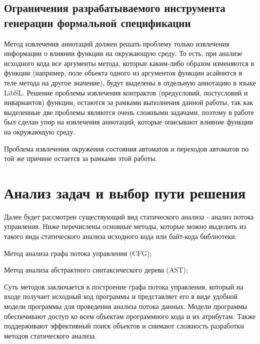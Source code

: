 \subsection{Ограничения разрабатываемого инструмента генерации формальной спецификации}

Метод извлечения аннотаций должен решать проблему только извлечения информации о влиянии функции на окружающую среду.
То есть, при анализе исходного кода все аргументы метода, которые каким-либо образом изменяются в функции (например, поле объекта одного из аргументов функции асайнится в теле метода на другое значение), будут выделены в отдельную аннотацию в языке LibSL.
Решение проблемы извлечения контрактов (предусловий, постусловий и инвариантов) функции,
остаются за рамками выполнения данной работы, так как выделенные две проблемы являются очень сложными задачами,
поэтому в работе был сделан упор на извлечения аннотаций, которые описывают влияние функции на окружающую среду.

Проблема извлечения окружения состояния автоматов и переходов автоматов по той же причине остается за рамками этой работы.

\section{Анализ задач и выбор пути решения}

Далее будет рассмотрен существующий вид статического анализа - анализ потока управления.
Ниже перечислены основные методы, которые можно выделить из такого вида статического анализа исходного кода или байт-кода библиотеки:
%
\begin{itemize*}
\item Метод анализа графа потока управления (CFG);
\item Метод анализа абстрактного синтаксического дерева (AST);
\end{itemize*}
%

Суть методов заключается в построение графа потока управления, который на входе получает исходный код программы и представляет его в виде удобной модели программы для проведения анализа потока данных.
Модели программы обеспечивают доступ ко всем объектам программного кода и их атрибутам. Также поддерживают эффективный поиск объектов и снимают сложность разработки методов статического анализа.

